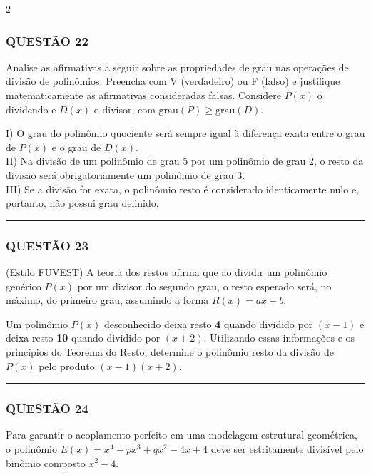 \documentclass[twoside, 10pt, a4paper]{article}
\begin{document}
\begin{multicols*}{2}
\subsubsection*{QUESTÃO 22}

Analise as afirmativas a seguir sobre as propriedades de grau nas operações de divisão de polinômios. Preencha com V (verdadeiro) ou F (falso) e justifique matematicamente as afirmativas consideradas falsas. Considere $ P(x) $ o dividendo e $ D(x) $ o divisor, com $ \text{grau}(P) \geq \text{grau}(D) $.

I) O grau do polinômio quociente será sempre igual à diferença exata entre o grau de $ P(x) $ e o grau de $ D(x) $.\\[0.3cm]
II) Na divisão de um polinômio de grau 5 por um polinômio de grau 2, o resto da divisão será obrigatoriamente um polinômio de grau 3.\\[0.3cm]
III) Se a divisão for exata, o polinômio resto é considerado identicamente nulo e, portanto, não possui grau definido.

\vspace{0cm} \noindent\textcolor{CorLinha}{\rule{\linewidth}{0.5pt}} \vspace{-0.2cm}
\subsubsection*{QUESTÃO 23}

(Estilo FUVEST) A teoria dos restos afirma que ao dividir um polinômio genérico $ P(x) $ por um divisor do segundo grau, o resto esperado será, no máximo, do primeiro grau, assumindo a forma $ R(x) = ax + b $. 

Um polinômio $ P(x) $ desconhecido deixa resto \textbf{4} quando dividido por $ (x - 1) $ e deixa resto \textbf{10} quando dividido por $ (x + 2) $. Utilizando essas informações e os princípios do Teorema do Resto, determine o polinômio resto da divisão de $ P(x) $ pelo produto $ (x - 1)(x + 2) $.

\vspace{0cm} \noindent\textcolor{CorLinha}{\rule{\linewidth}{0.5pt}} \vspace{-0.2cm}
\subsubsection*{QUESTÃO 24}

Para garantir o acoplamento perfeito em uma modelagem estrutural geométrica, o polinômio $ E(x) = x^4 - px^3 + qx^2 - 4x + 4 $ deve ser estritamente divisível pelo binômio composto $ x^2 - 4 $. 


\end{multicols*}
\end{document}
